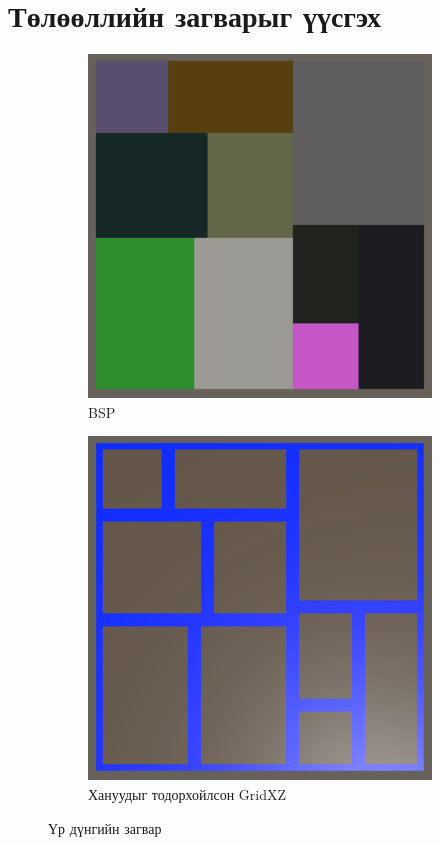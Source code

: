 \section{Төлөөллийн загварыг үүсгэх}
\begin{figure}[ht]
	\centering
	\begin{subfigure}{\textwidth/2}
		\centering
		\includegraphics[width=\textwidth-1cm]{./images/DrawTree.png}
		\caption{BSP}
		\label{fig:DrawTree}
	\end{subfigure}%
	\begin{subfigure}{\textwidth/2}
		\centering
		\includegraphics[width=\textwidth-1cm]{./images/ProceduralDungeonTestWall.png}
		\caption{Хануудыг тодорхойлсон GridXZ}
		\label{fig:ProceduralDungeonTestWall}
	\end{subfigure}
	\caption{Үр дүнгийн загвар}
	\label{fig:Results1}
\end{figure}
